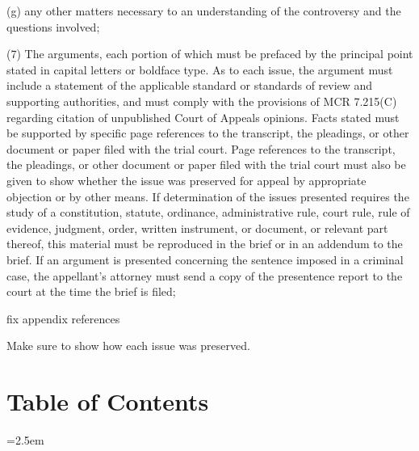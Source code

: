 \documentclass[12pt,\documentclassflag]{michiganCourtOfAppealsBrief}
\begin{document}
\begin{todolist}
      \item (g) any other matters necessary to an understanding of the controversy and the questions involved;

      \item (7) The arguments, each portion of which must be prefaced by the principal point stated in capital letters or boldface type. As to each issue, the argument must include a statement of the applicable standard or standards of review and supporting authorities, and must comply with the provisions of MCR 7.215(C) regarding citation of unpublished Court of Appeals opinions. Facts stated must be supported by specific page references to the transcript, the pleadings, or other document or paper filed with the trial court. Page references to the transcript, the pleadings, or other document or paper filed with the trial court must also be given to show whether the issue was preserved for appeal by appropriate objection or by other means. If determination of the issues presented requires the study of a constitution, statute, ordinance, administrative rule, court rule, rule of evidence, judgment, order, written instrument, or document, or relevant part thereof, this material must be reproduced in the brief or in an addendum to the brief. If an argument is presented concerning the sentence imposed in a criminal case, the appellant's attorney must send a copy of the presentence report to the court at the time the brief is filed;

        \item fix appendix references
        \item Make sure to show how each issue was preserved.
\end{todolist}

\newpage 

\section*{Table of Contents}

\tableofcontents


\newpage
\tableofauthorities


\parindent=2.5em
\doublespacing


\end{document}
